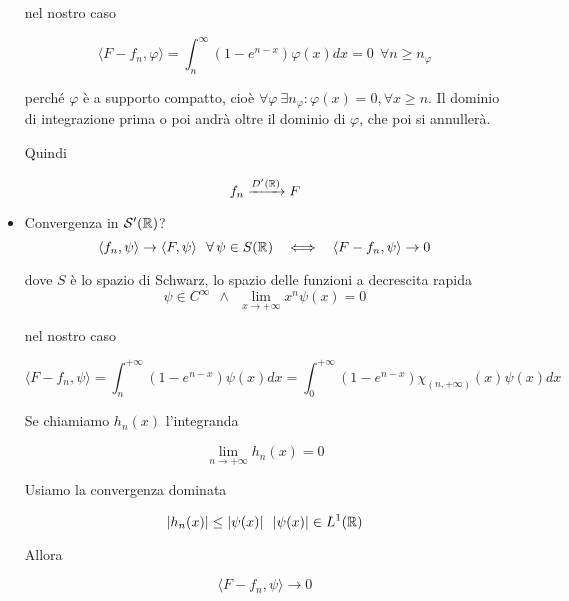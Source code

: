 \begin{itemize}
nel nostro caso

\begin{equation*}
\langle F - f_{n}, \varphi \rangle = \int^{\infty}_{n}\left(1 - e^{n - x}\right) \varphi (x)dx = 0\ \ \forall n \geq n_{\varphi}
\end{equation*}

perché $\varphi $ è a supporto compatto, cioè $\forall \varphi \ \exists n_{\varphi} :\varphi (x) = 0, \forall x \geq n$. Il dominio di integrazione prima o poi andrà oltre il dominio di $\varphi $, che poi si annullerà.

Quindi

\begin{equation*}
f_{n}\xrightarrow{D'(\mathbb{R})} F
\end{equation*}
\item Convergenza in $\mathcal{S}'(\mathbb{R})$?
\begin{equation*}
\langle f_{n}, \psi \rangle \rightarrow \langle F, \psi \rangle \ \ \forall \psi \in S(\RR) \ \ \iff \ \ \langle F - f_{n}, \psi \rangle \rightarrow 0
\end{equation*}

dove $S$ è lo spazio di Schwarz, lo spazio delle funzioni a decrescita rapida
\begin{equation*}
\psi \in C^{\infty} \ \ \land \ \ \lim\limits_{x\rightarrow + \infty} x^{n} \psi (x) = 0
\end{equation*}

nel nostro caso

\begin{equation*}
\langle F - f_{n}, \psi \rangle = \int^{+ \infty}_{n}\left(1 - e^{n - x}\right) \psi (x) dx = \int^{+ \infty}_{0}\left(1 - e^{n - x}\right) \chi_{(n, + \infty)}(x) \psi (x) dx
\end{equation*}

Se chiamiamo $h_{n}(x)$ l'integranda

\begin{equation*}
\lim\limits_{n\rightarrow + \infty} h_{n}(x) = 0
\end{equation*}

Usiamo la convergenza dominata

\begin{equation*}
| h_{n}(x)| \leq | \psi (x)| \ \ | \psi (x)| \in L^{1}(\mathbb{R})
\end{equation*}

Allora

\begin{equation*}
\langle F - f_{n}, \psi \rangle \rightarrow 0
\end{equation*}
\end{itemize}


